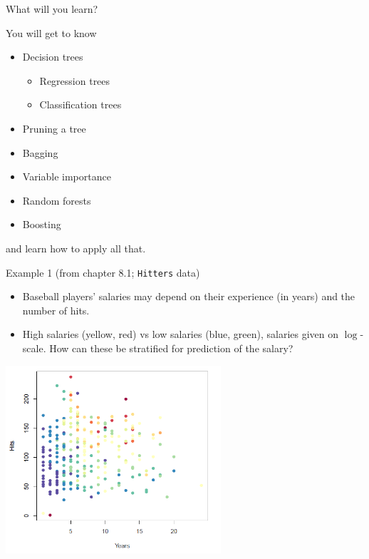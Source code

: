 \documentclass[10pt,ignorenonframetext,]{beamer}
\providecommand{\tightlist}{%
  \setlength{\itemsep}{0pt}\setlength{\parskip}{0pt}}
\begin{document}
\begin{frame}

\begin{block}{What will you learn?}

\vspace{2mm}

You will get to know

\begin{itemize}
\tightlist
\item
  Decision trees

  \begin{itemize}
  \tightlist
  \item
    Regression trees\\
  \item
    Classification trees\\
  \end{itemize}
\item
  Pruning a tree
\item
  Bagging
\item
  Variable importance
\item
  Random forests
\item
  Boosting
\end{itemize}

and learn how to apply all that.

\end{block}

\end{frame}

\begin{frame}[fragile]

\begin{block}{Example 1 (from chapter 8.1; \texttt{Hitters} data)}

\vspace{1mm}

\begin{itemize}
\item
  Baseball players' salaries may depend on their experience (in years)
  and the number of hits.
\item
  High salaries (yellow, red) vs low salaries (blue, green), salaries
  given on \(\log\)-scale. How can these be stratified for prediction of
  the salary?
\end{itemize}

\centering
\includegraphics[width=0.60000\textwidth]{hits.png}

\end{block}

\end{frame}
\end{document}
